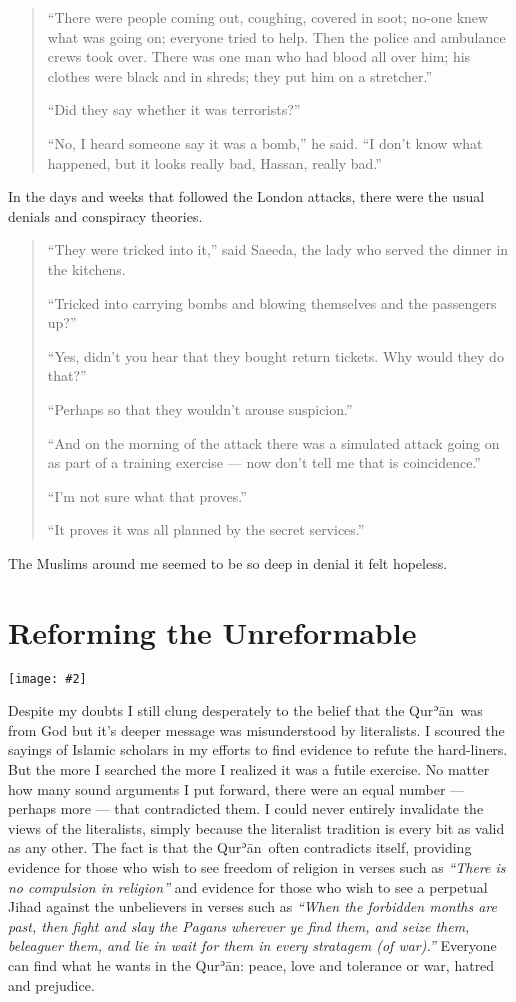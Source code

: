 \documentclass[12pt]{memoir}
\def\´{ʾ} %
\def \Quran{Qur\-\´ān} %
\newcommand{\img}[3]{\begin{center}%
\texttt{[image: \#2]}\\{\small\em#3}%
\end{center}}
\begin{document}
\begin{quote}
“There were people coming out, coughing, covered in soot;
no-one knew what was going on; everyone tried to help.
Then the police and ambulance crews took over.
There was one man who had blood all over him;
his clothes were black and in shreds; they put him on a stretcher.”

“Did they say whether it was terrorists?”

“No, I heard someone say it was a bomb,” he said.
“I don’t know what happened, but it looks really bad, Hassan, really bad.”
\end{quote}

In the days and weeks that followed the London attacks,
there were the usual denials and conspiracy theories.

\begin{quote}
“They were tricked into it,” said Saeeda,
the lady who served the dinner in the kitchens.

“Tricked into carrying bombs and blowing themselves and the passengers up?”

“Yes, didn’t you hear that they bought return tickets.
Why would they do that?”

“Perhaps so that they wouldn’t arouse suspicion.”

“And on the morning of the attack there was a simulated attack going on
as part of a training exercise — now don’t tell me that is coincidence.”

“I’m not sure what that proves.”

“It proves it was all planned by the secret services.”
\end{quote}

The Muslims around me seemed to be so deep in denial it felt hopeless.


\chapter{Reforming the Unreformable}

\img{scale=0.4}{Quranic_Script.jpg}{}

Despite my doubts I still clung desperately to the belief
that the \Quran\ was from God but it’s deeper message
was misunderstood by literalists.
I scoured the sayings of Islamic scholars in my efforts
to find evidence to refute the hard-liners.
But the more I searched the more I realized it was a futile exercise.
No matter how many sound arguments I put forward,
there were an equal number — perhaps more — that contradicted them.
I could never entirely invalidate the views of the literalists,
simply because the literalist tradition is every bit as valid as any other.
The fact is that the \Quran\ often contradicts itself,
providing evidence for those who wish to see freedom of religion
in verses such as \emph{“There is no compulsion in religion”}
and evidence for those who wish to see a perpetual Jihad against
the unbelievers in verses such as
\emph{“When the forbidden months are past, then fight and slay the Pagans
wherever ye find them, and seize them, beleaguer them,
and lie in wait for them in every stratagem (of war).”}
Everyone can find what he wants in the \Quran:
peace, love and tolerance or war, hatred and prejudice.
\end{document}
